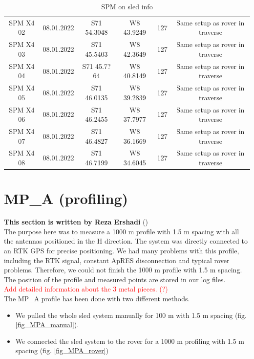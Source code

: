 \documentclass[a4paper,12pt]{article}
\begin{document}
\begin{table}[H]
\begin{tabular}[width=\textwidth]{c c c c c c}
    SPM X4 02 & 08.01.2022 & S71 54.3048 & W8 43.9249 & 127 & Same setup as rover in traverse\\
    SPM X4 03 & 08.01.2022 & S71 45.5403 & W8 42.3649 & 127 & Same setup as rover in traverse\\
    SPM X4 04 & 08.01.2022 & S71 45.7?64 & W8 40.8149 & 127 & Same setup as rover in traverse\\
    SPM X4 05 & 08.01.2022 & S71 46.0135 & W8 39.2839 & 127 & Same setup as rover in traverse\\
    SPM X4 06 & 08.01.2022 & S71 46.2455 & W8 37.7977 & 127 & Same setup as rover in traverse\\
    SPM X4 07 & 08.01.2022 & S71 46.4827 & W8 36.1669 & 127 & Same setup as rover in traverse\\
    SPM X4 08 & 08.01.2022 & S71 46.7199 & W8 34.6045 & 127 & Same setup as rover in traverse\\
    \hline
  \end{tabular}
  \caption{SPM on sled info}
  \label{Table_SPM_sled}
\end{table}
\pagebreak
\section{MP\_A (profiling)}
\textbf{This section is written by Reza Ershadi}
(\href{mailto:mohammadreza.ershadi@uni-tuebingen.de}{\color{blue}{Email Me}})\\

The purpose here was to measure a 1000 m profile with 1.5 m spacing with all the
antennas positioned in the H direction. The system was directly connected to an
RTK GPS for precise positioning. We had many problems with this profile,
including the RTK signal, constant ApRES disconnection and typical rover
problems. Therefore, we could not finish the 1000 m profile with 1.5 m spacing.
The position of the profile and measured points are stored in our log files.\\

\textcolor{red}{Add detailed information about the 3 metal pieces. (?)}\\

The MP\_A profile has been done with two different methods.
\begin{itemize}
  \item We pulled the whole sled system manually for 100 m with 1.5 m spacing (fig. \ref{fig_MPA_manual}).
  \item We connected the sled system to the rover for a 1000 m profiling with 1.5 m spacing (fig. \ref{fig_MPA_rover})
\end{itemize}
\end{document}
